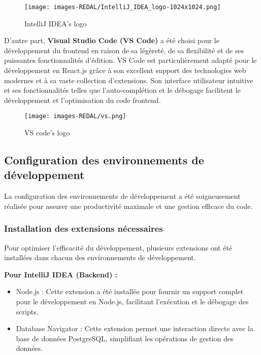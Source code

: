 \begin{figure}[H]
\begin{center}
\texttt{[image: images-REDAL/IntelliJ\_IDEA\_logo-1024x1024.png]}
\end{center}
\caption{IntelliJ IDEA's logo}
\end{figure}


D'autre part, \textbf{Visual Studio Code (VS Code)} a été choisi pour le développement du frontend en raison de sa légèreté, de sa flexibilité et de ses puissantes fonctionnalités d'édition. VS Code est particulièrement adapté pour le développement en React.js grâce à son excellent support des technologies web modernes et à sa vaste collection d'extensions. Son interface utilisateur intuitive et ses fonctionnalités telles que l'auto-complétion et le débogage facilitent le développement et l'optimisation du code frontend.

\begin{figure}[H]
\begin{center}
\texttt{[image: images-REDAL/vs.png]}
\end{center}
\caption{VS code's logo}
\end{figure}






\subsection{Configuration des environnements de développement}
La configuration des environnements de développement a été soigneusement réalisée pour assurer une productivité maximale et une gestion efficace du code.



\subsubsection{Installation des extensions nécessaires}
Pour optimiser l'efficacité du développement, plusieurs extensions ont été installées dans chacun des environnements de développement.

\textbf{Pour IntelliJ IDEA (Backend) :}
\begin{itemize}

\item Node.js :
Cette extension a été installée pour fournir un support complet pour le développement en Node.js, facilitant l'exécution et le débogage des scripts.
\item Database Navigator :
Cette extension permet une interaction directe avec la base de données PostgreSQL, simplifiant les opérations de gestion des données.
\end{itemize}

